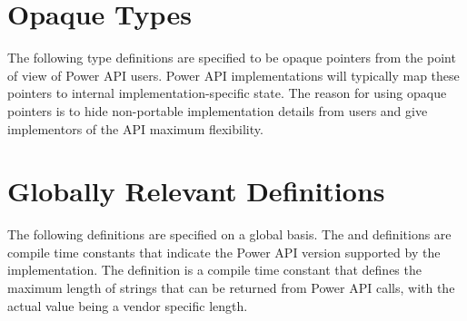 
\section{Opaque Types}\label{sec:OpaqueTypes}

The following type definitions are specified to be opaque pointers from the point of view of Power API users.
Power API implementations will typically map these pointers to internal implementation-specific state.
The reason for using opaque pointers is to hide non-portable implementation details from users and give implementors of the API maximum flexibility.

\begin{typedefs}
\end{typedefs}


\section{Globally Relevant Definitions}\label{sec:GlobalTypes}

The following definitions are specified on a global basis.
The \MAJORVERSIONrefx and  definitions are compile time constants that indicate the Power API version supported by the implementation.
The  definition is a compile time constant that defines the maximum length of strings that can be returned from Power API calls, with the actual value being a vendor specific length.

\begin{typedefs}
	\pounddefineMAJORVERSION
	\pounddefineMINORVERSION
	\pounddefineMAXSTRINGLEN
\end{typedefs}

